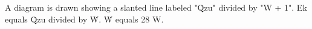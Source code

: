 A diagram is drawn showing a slanted line labeled "Q̇zu" divided by "W + 1".  
Ek equals Q̇zu divided by Ẇ.  
Ẇ equals 28 W.